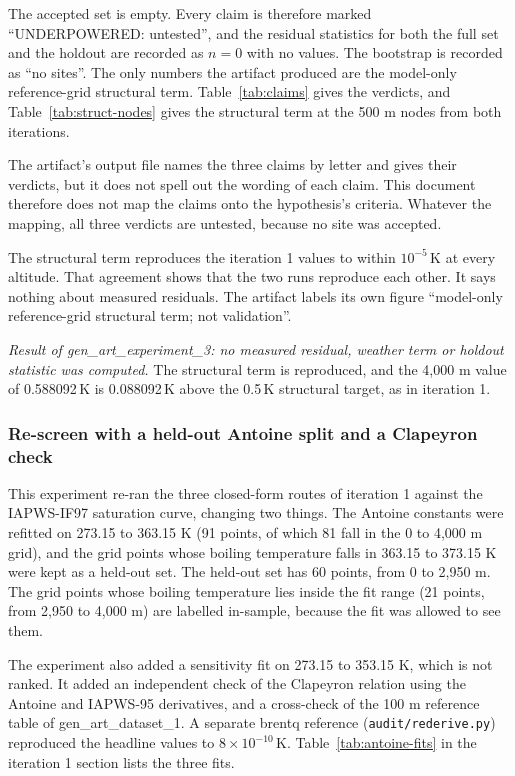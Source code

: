 \documentclass[11pt,letterpaper]{article}
\begin{document}
The accepted set is empty. Every claim is therefore marked ``UNDERPOWERED: untested'', and the residual statistics for both the full set and the holdout are recorded as $n = 0$ with no values. The bootstrap is recorded as ``no sites''. The only numbers the artifact produced are the model-only reference-grid structural term. Table~\ref{tab:claims} gives the verdicts, and Table~\ref{tab:struct-nodes} gives the structural term at the 500 m nodes from both iterations.

The artifact's output file names the three claims by letter and gives their verdicts, but it does not spell out the wording of each claim. This document therefore does not map the claims onto the hypothesis's criteria. Whatever the mapping, all three verdicts are untested, because no site was accepted.




The structural term reproduces the iteration 1 values to within $10^{-5}$\,K at every altitude. That agreement shows that the two runs reproduce each other. It says nothing about measured residuals. The artifact labels its own figure ``model-only reference-grid structural term; not validation''.

\emph{Result of gen\_art\_experiment\_3: no measured residual, weather term or holdout statistic was computed.} The structural term is reproduced, and the 4,000 m value of 0.588092\,K is 0.088092\,K above the 0.5\,K structural target, as in iteration 1.

\subsubsection{Re-screen with a held-out Antoine split and a Clapeyron check}

This experiment re-ran the three closed-form routes of iteration 1 against the IAPWS-IF97 saturation curve, changing two things. The Antoine constants were refitted on 273.15 to 363.15 K (91 points, of which 81 fall in the 0 to 4,000 m grid), and the grid points whose boiling temperature falls in 363.15 to 373.15 K were kept as a held-out set. The held-out set has 60 points, from 0 to 2,950 m. The grid points whose boiling temperature lies inside the fit range (21 points, from 2,950 to 4,000 m) are labelled in-sample, because the fit was allowed to see them.

The experiment also added a sensitivity fit on 273.15 to 353.15 K, which is not ranked. It added an independent check of the Clapeyron relation using the Antoine and IAPWS-95 derivatives, and a cross-check of the 100 m reference table of gen\_art\_dataset\_1. A separate brentq reference (\texttt{audit/rederive.py}) reproduced the headline values to $8 \times 10^{-10}$\,K. Table~\ref{tab:antoine-fits} in the iteration 1 section lists the three fits.
\end{document}
